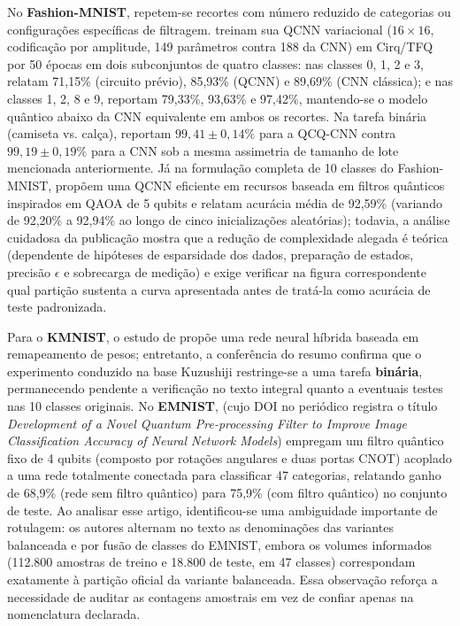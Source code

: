 \documentclass[
    12pt,
    openright,
    oneside,
    a4paper,
    english,
    brazil
]{abntex2}
\begin{document}
No \textbf{Fashion-MNIST}, repetem-se recortes com número reduzido de categorias ou configurações específicas de filtragem.  treinam sua QCNN variacional (\(16 \times 16\), codificação por amplitude, 149 parâmetros contra 188 da CNN) em Cirq/TFQ por 50 épocas em dois subconjuntos de quatro classes: nas classes 0, 1, 2 e 3, relatam 71,15\% (circuito prévio), 85,93\% (QCNN) e 89,69\% (CNN clássica); e nas classes 1, 2, 8 e 9, reportam 79,33\%, 93,63\% e 97,42\%, mantendo-se o modelo quântico abaixo da CNN equivalente em ambos os recortes. Na tarefa binária (camiseta vs. calça),  reportam \(99{,}41 \pm 0{,}14\%\) para a QCQ-CNN contra \(99{,}19 \pm 0{,}19\%\) para a CNN sob a mesma assimetria de tamanho de lote mencionada anteriormente. Já na formulação completa de 10 classes do Fashion-MNIST,  propõem uma QCNN eficiente em recursos baseada em filtros quânticos inspirados em QAOA de 5 qubits e relatam acurácia média de 92,59\% (variando de 92,20\% a 92,94\% ao longo de cinco inicializações aleatórias); todavia, a análise cuidadosa da publicação mostra que a redução de complexidade alegada é teórica (dependente de hipóteses de esparsidade dos dados, preparação de estados, precisão \(\epsilon\) e sobrecarga de medição) e exige verificar na figura correspondente qual partição sustenta a curva apresentada antes de tratá-la como acurácia de teste padronizada.

Para o \textbf{KMNIST}, o estudo de  propõe uma rede neural híbrida baseada em remapeamento de pesos; entretanto, a conferência do resumo confirma que o experimento conduzido na base Kuzushiji restringe-se a uma tarefa \textbf{binária}, permanecendo pendente a verificação no texto integral quanto a eventuais testes nas 10 classes originais. No \textbf{EMNIST},  (cujo DOI no periódico registra o título \textit{Development of a Novel Quantum Pre-processing Filter to Improve Image Classification Accuracy of Neural Network Models}) empregam um filtro quântico fixo de 4 qubits (composto por rotações angulares e duas portas CNOT) acoplado a uma rede totalmente conectada para classificar 47 categorias, relatando ganho de 68,9\% (rede sem filtro quântico) para 75,9\% (com filtro quântico) no conjunto de teste. Ao analisar esse artigo, identificou-se uma ambiguidade importante de rotulagem: os autores alternam no texto as denominações das variantes balanceada e por fusão de classes do EMNIST, embora os volumes informados (112.800 amostras de treino e 18.800 de teste, em 47 classes) correspondam exatamente à partição oficial da variante balanceada. Essa observação reforça a necessidade de auditar as contagens amostrais em vez de confiar apenas na nomenclatura declarada.
\end{document}
